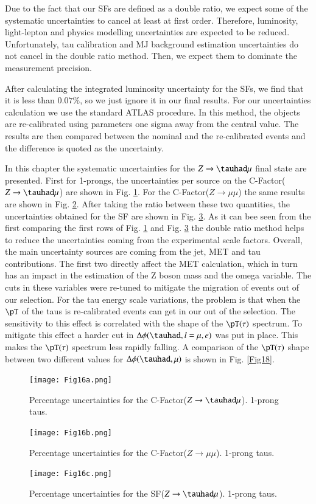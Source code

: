 Due to the fact that our SFs are defined as a double ratio, we expect some of the systematic uncertainties to cancel at least at first order. Therefore, luminosity, light-lepton and physics modelling uncertainties are expected to be reduced. Unfortunately, tau calibration and MJ background estimation uncertainties do not cancel in the double ratio method. Then, we expect them to dominate the measurement precision.

After calculating the integrated luminosity uncertainty for the SFs, we find that it is less than $0.07\%$, so we just ignore it in our final results. For our uncertainties calculation we use the standard ATLAS procedure. In this method, the objects are re-calibrated using parameters one sigma away from the central value. The results are then compared between the nominal and the re-calibrated events and the difference is quoted as the uncertainty. 

In this chapter the systematic uncertainties for the $Z\to\tauhad\mu$ final state are presented. First for 1-prongs, the uncertainties per source on the C-Factor($Z\to\tauhad \mu$) are shown in Fig. \ref{Fig16a}. For the C-Factor($Z\to\mu\mu$) the same results are shown in Fig. \ref{Fig16b}. After taking the ratio between these two quantities, the uncertainties obtained for the SF are shown in Fig. \ref{Fig16c}. As it can bee seen from the first comparing the first rows of Fig. \ref{Fig16a} and Fig. \ref{Fig16c} the double ratio method helps to reduce the uncertainties coming from the experimental scale factors. Overall, the main uncertainty sources are coming from the jet, MET and tau contributions. The first two directly affect the MET calculation, which in turn has an impact in the estimation of the Z boson mass and the omega variable. The cuts in these variables were re-tuned to mitigate the migration of events out of our selection. For the tau energy scale variations, the problem is that when the $\pT$ of the taus is re-calibrated events can get in our out of the selection. The sensitivity to this effect is correlated with the shape of the $\pT(\tau)$ spectrum. To mitigate this effect a harder cut in $\Delta\phi(\tauhad ,l=\mu , e)$ was put in place. This makes the $\pT(\tau)$ spectrum less rapidly falling. A comparison of the $\pT(\tau)$ shape between two different values for $\Delta\phi(\tauhad ,\mu)$ is shown in Fig. \ref{Fig18}.    

\begin{figure}[htbp]
	\centering
	\texttt{[image: Fig16a.png]}
	\caption{Percentage uncertainties for the C-Factor($Z\to\tauhad\mu$). 1-prong taus.}
	\label{Fig16a}
\end{figure}
\begin{figure}[htbp]
	\centering
	\texttt{[image: Fig16b.png]}
	\caption{Percentage uncertainties for the C-Factor($Z\to\mu\mu$). 1-prong taus.}
	\label{Fig16b}
\end{figure}
\begin{figure}[htbp]
	\centering
	\texttt{[image: Fig16c.png]}
	\caption{Percentage uncertainties for the SF($Z\to\tauhad\mu$). 1-prong taus.}
	\label{Fig16c}
\end{figure}

